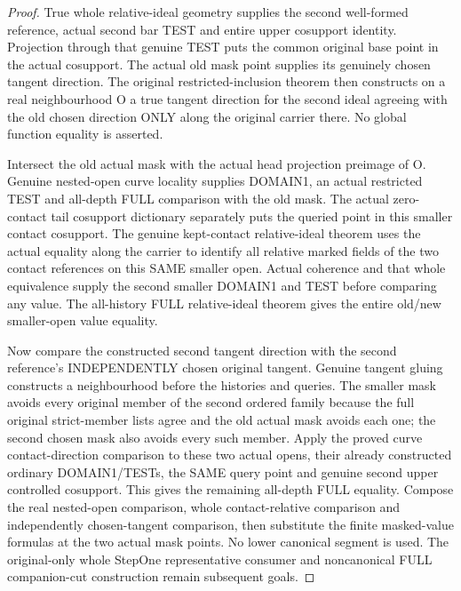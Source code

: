 \begin{proof}
True whole relative-ideal geometry supplies the second well-formed
reference, actual second bar TEST and entire upper cosupport identity.
Projection through that genuine TEST puts the common original base point
in the actual cosupport. The actual old mask point supplies its genuinely
chosen tangent direction. The original restricted-inclusion theorem then
constructs on a real neighbourhood O a true tangent direction for the
second ideal agreeing with the old chosen direction ONLY along the
original carrier there. No global function equality is asserted.

Intersect the old actual mask with the actual head projection preimage
of O. Genuine nested-open curve locality supplies DOMAIN1, an actual
restricted TEST and all-depth FULL comparison with the old mask. The
actual zero-contact tail cosupport dictionary separately puts the queried
point in this smaller contact cosupport. The genuine kept-contact
relative-ideal theorem uses the actual equality along the carrier to
identify all relative marked fields of the two contact references on
this SAME smaller open. Actual coherence and that whole equivalence
supply the second smaller DOMAIN1 and TEST before comparing any value.
The all-history FULL relative-ideal theorem gives the entire old/new
smaller-open value equality.

Now compare the constructed second tangent direction with the second
reference's INDEPENDENTLY chosen original tangent. Genuine tangent gluing
constructs a neighbourhood before the histories and queries. The smaller
mask avoids every original member of the second ordered family because
the full original strict-member lists agree and the old actual mask
avoids each one; the second chosen mask also avoids every such member.
Apply the proved curve contact-direction comparison to these two actual
opens, their already constructed ordinary DOMAIN1/TESTs, the SAME query
point and genuine second upper controlled cosupport. This gives the
remaining all-depth FULL equality. Compose the real nested-open comparison,
whole contact-relative comparison and independently chosen-tangent
comparison, then substitute the finite masked-value formulas at the two
actual mask points. No lower canonical segment is used. The original-only
whole StepOne representative consumer and noncanonical FULL companion-cut
construction remain subsequent goals.
\end{proof}
